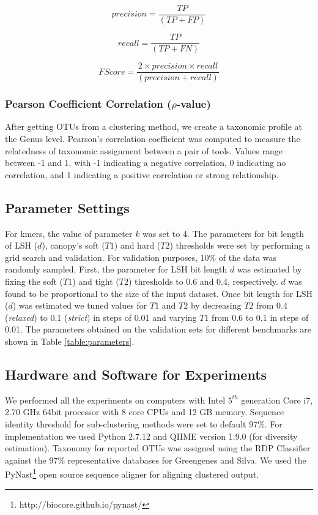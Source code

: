 \documentclass[letterpaper,twocolumn]{article}
\begin{document}
\begin{equation}
precision = \frac{TP}{(TP + FP)}
\end{equation}

\begin{equation}
recall = \frac{TP}{(TP + FN)}
\end{equation}

\begin{equation}
F Score = \frac{2 \times precision \times recall}{(precision + recall)}
\end{equation}

\subsubsection{Pearson Coefficient Correlation ($\rho$-value)}
After getting OTUs from a clustering method, we create a taxonomic profile at the Genus level. Pearson’s correlation coefficient was computed to measure the relatedness of taxonomic assignment between a pair of tools. Values range between -1 and 1, with -1 indicating a negative correlation, 0 indicating no correlation, and 1 indicating a positive correlation or strong relationship.

\subsection{Parameter Settings}
For kmers, the value of parameter $k$ was set to 4. The parameters for bit length of LSH ($d$), 
canopy's soft ($T1$) and 
hard ($T2$) thresholds were set by performing a grid search and validation. For validation purposes, 10\%  of the 
data was randomly sampled. First, the parameter for LSH 
bit length $d$ was estimated by fixing 
the soft ($T1$) and tight ($T2$) thresholds 
to 0.6 and 0.4, respectively.  $d$ was found to be proportional to the 
size of the input dataset. 
%
Once bit length for 
LSH  ($d$) was estimated we tuned values for $T1$ and $T2$ by decreasing $T2$ from 0.4 (\emph{relaxed}) to 0.1 (\emph{strict}) in steps of 0.01 and varying 
$T1$ from 0.6 to 0.1 in steps of 0.01. The parameters obtained on the 
validation sets for different benchmarks are 
shown in Table \ref{table:parameters}.

\subsection{Hardware and Software for Experiments}
We performed all the experiments on computers with Intel $5^{th}$ 
generation Core i7, 2.70 GHz 64bit processor with 8 core CPUs and 
12 GB memory. Sequence identity threshold for  
sub-clustering methods were set to default 97\%. For implementation we 
used Python 2.7.12 and QIIME\cite{MARQiime} version 1.9.0 (for diversity estimation).  Taxonomy for reported OTUs was assigned 
using the RDP Classifier\cite{MARRdp} against the 97\% representative databases for Greengenes\cite{MARGreen1} and Silva\cite{MARSilva}. We
used the PyNast\footnote{http://biocore.github.io/pynast/} open source sequence aligner
for aligning clustered output. 
\end{document}
